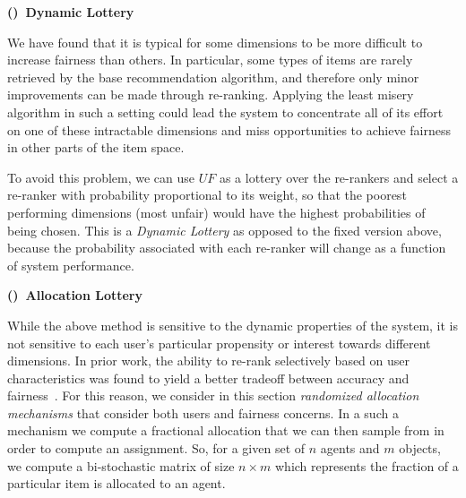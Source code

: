 
\vspace{0.25cm}
\noindent \textbf{()~Dynamic Lottery}
\vspace{0.25cm}

We have found that it is typical for some dimensions to be more difficult to increase fairness than others. In particular, some types of items are rarely retrieved by the base recommendation algorithm, and therefore only minor improvements can be made through re-ranking. Applying the least misery algorithm in such a setting could lead the system to concentrate all of its effort on one of these intractable dimensions and miss opportunities to achieve fairness in other parts of the item space. 

To avoid this problem, we can use $UF$ as a lottery over the re-rankers and select a re-ranker with probability proportional to its weight, so that the poorest performing dimensions (most unfair) would have the highest probabilities of being chosen. This is a \textit{Dynamic Lottery} as opposed to the fixed version above, because the probability associated with each re-ranker will change as a function of system performance.

\vspace{0.25cm}
\noindent \textbf{()~Allocation Lottery}
\vspace{0.25cm}

While the above method is sensitive to the dynamic properties of the system, it is not sensitive to each user's particular propensity or interest towards different dimensions. In prior work, the ability to re-rank selectively based on user characteristics was found to yield a better tradeoff between accuracy and fairness~\cite{liu2019personalized,sonboli-umap-2020}. For this reason, we consider in this section \emph{randomized allocation mechanisms} that consider both users and fairness concerns.  In a such a mechanism we compute a fractional allocation that we can then sample from in order to compute an assignment.  So, for a given set of $n$ agents and $m$ objects, we compute a bi-stochastic matrix of size $n \times m$ which represents the fraction of a particular item is allocated to an agent.

